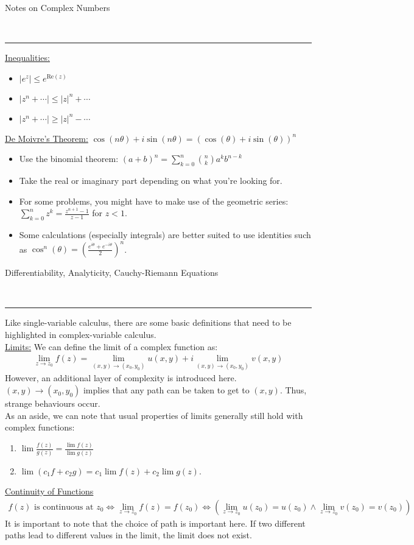 \documentclass{article}
\newcommand{\header}[1]{\begin{large}\noindent #1\end{large}\\\rule{\textwidth}{0.5pt}}
\newcommand{\gap}{\medskip\\}
\newcommand{\sheader}[1]{\underline{#1:}}
\newcommand{\ds}{\displaystyle}
\begin{document}
    \header{Notes on Complex Numbers}
    \sheader{Inequalities}
    \begin{itemize}
        \setlength\itemsep{0em}
        \item $|e^z| \leq e^{\text{Re}(z)}$
        \item $|z^n + \cdots | \leq |z|^n + \cdots $
        \item $|z^n + \cdots | \geq |z|^n - \cdots $
    \end{itemize}
    \sheader{De Moivre's Theorem} $\displaystyle \cos(n\theta) + i\sin(n\theta) = (\cos(\theta) + i \sin(\theta))^n$
    \begin{itemize}
        \setlength\itemsep{0em}
        \item Use the binomial theorem: $\displaystyle (a + b)^n = \sum_{k = 0}^n {n \choose k}a^{k}b^{n-k}$
        \item Take the real or imaginary part depending on what you're looking for.
        \item For some problems, you might have to make use of the geometric series: $\sum_{k = 0}^n z^k = \frac{z^{n + 1} - 1}{z - 1}$ for $z < 1$.
        \item Some calculations (especially integrals) are better suited to use identities such as $\cos^n(\theta) = \left(\frac{e^{i\theta} + e^{-i\theta}}{2}\right)^n$.
    \end{itemize}
    
    \header{Differentiability, Analyticity, Cauchy-Riemann Equations}
    Like single-variable calculus, there are some basic definitions that need to 
    be highlighted in complex-variable calculus.
    \gap
    \sheader{Limits}
    We can define the limit of a complex function as:
    \begin{align*}
        \lim_{z \to z_0} f(z) = \lim_{(x, y) \to (x_0, y_0)}u(x, y) + i \lim_{(x, y) \to (x_0, y_0)}v(x, y)
    \end{align*}
    However, an additional layer of complexity is introduced here. $(x, y) \to (x_0, y_0)$
    implies that any path can be taken to get to $(x,y)$. Thus, strange behaviours occur.
    \gap
    As an aside, we can note that usual properties of limits generally still hold 
    with complex functions:
    \begin{enumerate}
        \item $\ds \lim \frac{f(z)}{g(z)} = \frac{\lim f(z)}{\lim g(z)}$
        \item $\lim(c_1 f + c_2 g) = c_1 \lim f(z) + c_2 \lim g(z)$.
    \end{enumerate}
    \underline{Continuity of Functions}
    \begin{align*}
        f(z) \textrm{ is continuous at }z_0 \iff \lim_{z \to z_0} f(z) = f(z_0) \iff \left(\lim_{z \to z_0} u(z_0) = u(z_0) \wedge \lim_{z \to z_0} v(z_0) = v(z_0)\right)
    \end{align*}
    It is important to note that the choice of path is important here. 
    If two different paths lead to different values in the limit, the limit does not 
    exist.
    
\end{document}
